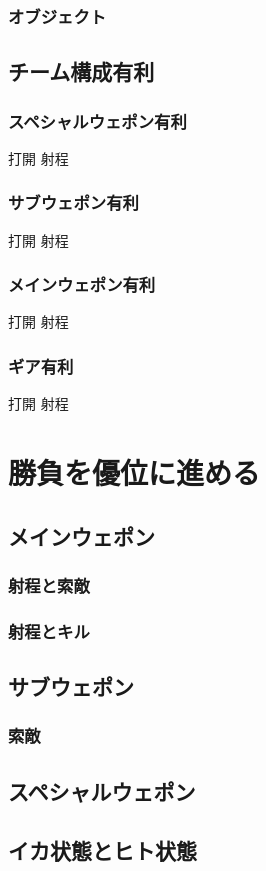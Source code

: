 \documentclass[a4paper,11pt]{jsbook}
\begin{document}
\subsection{オブジェクト}
\section{チーム構成有利}
\subsection{スペシャルウェポン有利}
打開
射程
\subsection{サブウェポン有利}
打開
射程
\subsection{メインウェポン有利}
打開
射程
\subsection{ギア有利}
打開
射程

\chapter{勝負を優位に進める}
\section{メインウェポン}
\subsection{射程と索敵}
\subsection{射程とキル}
\section{サブウェポン}
\subsection{索敵}
\section{スペシャルウェポン}
\section{イカ状態とヒト状態}
\end{document}
